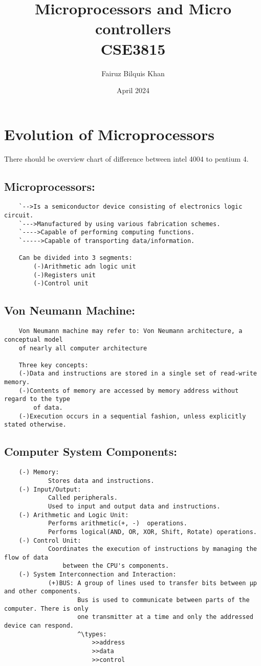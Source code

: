 \documentclass{article}
\title{Microprocessors and Micro controllers \\ CSE3815}
\author{Fairuz Bilquis Khan}
\date{April 2024}
\begin{document}
\maketitle
\newpage
\section*{Evolution of Microprocessors}
There should be overview chart of difference between intel 4004 to pentium 4.
\newpage
\subsection*{Microprocessors:}
\begin{verbatim}
    `-->Is a semiconductor device consisting of electronics logic circuit.
    `--->Manufactured by using various fabrication schemes.
    `---->Capable of performing computing functions.
    `----->Capable of transporting data/information.

    Can be divided into 3 segments:
        (-)Arithmetic adn logic unit
        (-)Registers unit
        (-)Control unit
\end{verbatim}

\subsection*{Von Neumann Machine:}
\begin{verbatim}
    Von Neumann machine may refer to: Von Neumann architecture, a conceptual model
    of nearly all computer architecture

    Three key concepts:
    (-)Data and instructions are stored in a single set of read-write memory.
    (-)Contents of memory are accessed by memory address without regard to the type
        of data.
    (-)Execution occurs in a sequential fashion, unless explicitly stated otherwise.
\end{verbatim}

\subsection*{Computer System Components:}
\begin{verbatim}
    (-) Memory:
            Stores data and instructions.
    (-) Input/Output:
            Called peripherals.
            Used to input and output data and instructions.
    (-) Arithmetic and Logic Unit:
            Performs arithmetic(+, -)  operations.
            Performs logical(AND, OR, XOR, Shift, Rotate) operations.
    (-) Control Unit:
            Coordinates the execution of instructions by managing the flow of data 
                between the CPU's components.
    (-) System Interconnection and Interaction:
            (+)BUS: A group of lines used to transfer bits between µp and other components.
                    Bus is used to communicate between parts of the computer. There is only
                    one transmitter at a time and only the addressed device can respond.
                    ^\types:
                        >>address
                        >>data
                        >>control
   
        \end{verbatim}
\newpage
\end{document}
